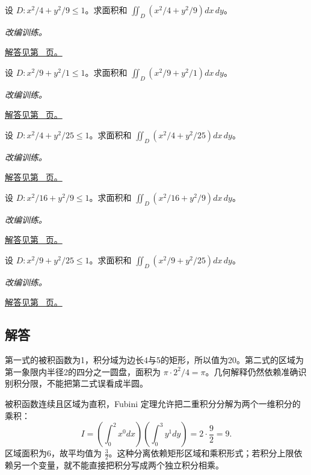 \documentclass[UTF8,12pt,a4paper,fontset=fandol]{ctexart}
\begin{document}
\begin{example}[椭圆换元与面积矩]\label{ex:c36q21}
设 $D:x^2/4+y^2/9\le1$。求面积和 $\displaystyle\iint_D(x^2/4+y^2/9)dx\,dy$。
\par\textit{改编训练。}\par\hyperref[ans:c36q21]{解答见第~\pageref{ans:c36q21} 页。}
\end{example}
\begin{example}[椭圆换元与面积矩]\label{ex:c36q22}
设 $D:x^2/9+y^2/1\le1$。求面积和 $\displaystyle\iint_D(x^2/9+y^2/1)dx\,dy$。
\par\textit{改编训练。}\par\hyperref[ans:c36q22]{解答见第~\pageref{ans:c36q22} 页。}
\end{example}
\begin{example}[椭圆换元与面积矩]\label{ex:c36q23}
设 $D:x^2/4+y^2/25\le1$。求面积和 $\displaystyle\iint_D(x^2/4+y^2/25)dx\,dy$。
\par\textit{改编训练。}\par\hyperref[ans:c36q23]{解答见第~\pageref{ans:c36q23} 页。}
\end{example}
\begin{example}[椭圆换元与面积矩]\label{ex:c36q24}
设 $D:x^2/16+y^2/9\le1$。求面积和 $\displaystyle\iint_D(x^2/16+y^2/9)dx\,dy$。
\par\textit{改编训练。}\par\hyperref[ans:c36q24]{解答见第~\pageref{ans:c36q24} 页。}
\end{example}
\begin{example}[椭圆换元与面积矩]\label{ex:c36q25}
设 $D:x^2/9+y^2/25\le1$。求面积和 $\displaystyle\iint_D(x^2/9+y^2/25)dx\,dy$。
\par\textit{改编训练。}\par\hyperref[ans:c36q25]{解答见第~\pageref{ans:c36q25} 页。}
\end{example}
\subsection{解答}
\begin{solve}\label{ans:c36q1}
第一式的被积函数为1，积分域为边长4与5的矩形，所以值为20。第二式的区域为第一象限内半径2的四分之一圆盘，面积为 $\pi\cdot2^2/4=\pi$。几何解释仍然依赖准确识别积分限，不能把第二式误看成半圆。
\end{solve}

\begin{solve}\label{ans:c36q2}
被积函数连续且区域为直积，Fubini 定理允许把二重积分分解为两个一维积分的乘积：
\[
I=\left(\int_0^2x^{0}dx\right)\left(\int_0^3y^{1}dy\right)=2\cdot\frac{9}{2}=9.
\]
区域面积为6，故平均值为 $\frac{3}{2}$。这种分离依赖矩形区域和乘积形式；若积分上限依赖另一个变量，就不能直接把积分写成两个独立积分相乘。
\end{solve}
\end{document}
